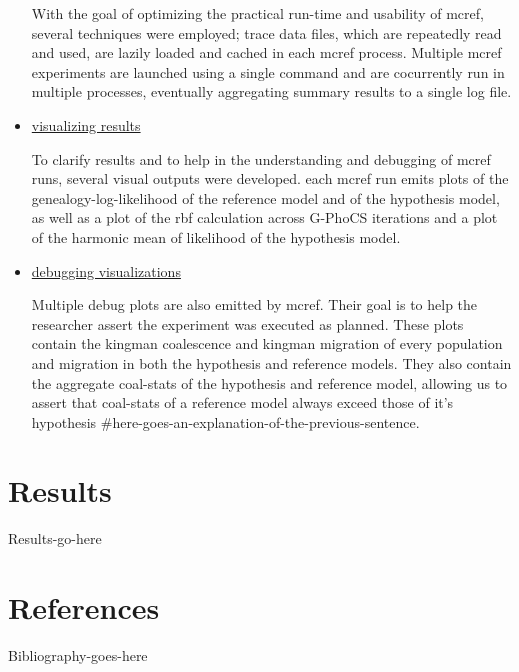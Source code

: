 \documentclass[11pt]{article}
\newcommand{\1}{\mathbbm{1}}
\newcommand{\gp}{G-PhoCS }
\begin{document}
\begin{itemize}
With the goal of optimizing the practical run-time and usability of mcref, several techniques were employed; trace data files, which are repeatedly read and used, are lazily loaded and cached in each mcref process. Multiple mcref experiments are launched using a single command and are cocurrently run in multiple processes, eventually aggregating summary results to a single log file. 

\item \underline{visualizing results}

To clarify results and to help in the understanding and debugging of mcref runs, several visual outputs were developed. each mcref run emits plots of the genealogy-log-likelihood of the reference model and of the hypothesis model, as well as a plot of the rbf calculation across \gp iterations and a plot of the harmonic mean of likelihood of the hypothesis model.

\item \underline{debugging visualizations}

Multiple debug plots are also emitted by mcref. Their goal is to help the researcher assert the experiment was executed as planned. These plots contain the kingman coalescence and kingman migration of every population and migration in both the hypothesis and reference models. They also contain the aggregate coal-stats of the hypothesis and reference model, allowing us to assert that coal-stats of a reference model always exceed those of it's hypothesis \#here-goes-an-explanation-of-the-previous-sentence. 
\end{itemize}



\section{Results}
Results-go-here

\newpage

\section{References}
Bibliography-goes-here
\end{document}
